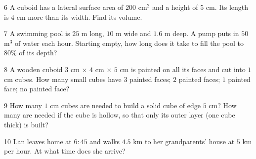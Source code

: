 \gap
\begin{probbox}{6}{}
A cuboid has a lateral surface area of $200$ cm$^2$ and a height of $5$ cm. Its length is $4$ cm more than its width. Find its volume.
\end{probbox}
\gap
\begin{probbox}{7}{\relax}
A swimming pool is $25$ m long, $10$ m wide and $1.6$ m deep. A pump puts in $50$ m$^3$ of water each hour. Starting empty, how long does it take to fill the pool to $80\%$ of its depth?
\end{probbox}
\gap
\begin{probbox}{8}{\relax}
A wooden cuboid $3$ cm $\times$ $4$ cm $\times$ $5$ cm is painted on all its faces and cut into $1$ cm cubes. How many small cubes have  $3$ painted faces;  $2$ painted faces;  $1$ painted face;  no painted face?
\end{probbox}
\gap
\begin{probbox}{9}{\relax}
How many $1$ cm cubes are needed to build a solid cube of edge $5$ cm? How many are needed if the cube is hollow, so that only its outer layer (one cube thick) is built?
\end{probbox}
\gap
\begin{probbox}{10}{\relax}
Lan leaves home at $6{:}45$ and walks $4.5$ km to her grandparents' house at $5$ km per hour. At what time does she arrive?
\end{probbox}
